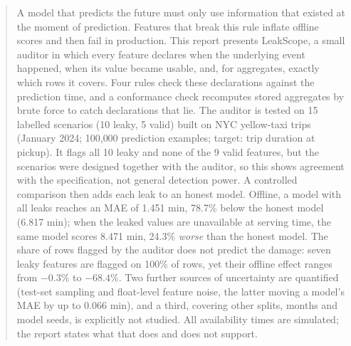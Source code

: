 \documentclass[11pt,a4paper]{article}
\newcommand{\statbox}[4]{%
  \node[draw=teal,fill=softgray,rounded corners=3pt,minimum width=3.75cm,minimum height=2.1cm,
        align=center,font=\sffamily,inner sep=4pt,text width=3.4cm]
    at ([xshift=#1,yshift=-21.2cm]current page.north west)
    {{\Large\bfseries\textcolor{navy}{#2}}\\[2pt]{\footnotesize\textcolor{gray!70!black}{#3}}};}
\begin{document}
\begin{titlepage}
\end{titlepage}

\begin{abstract}
\noindent
A model that predicts the future must only use information that existed at the moment of prediction. Features that break this rule inflate offline scores and then fail in production. This report presents LeakScope, a small auditor in which every feature declares when the underlying event happened, when its value became usable, and, for aggregates, exactly which rows it covers. Four rules check these declarations against the prediction time, and a conformance check recomputes stored aggregates by brute force to catch declarations that lie. The auditor is tested on 15 labelled scenarios (10 leaky, 5 valid) built on NYC yellow-taxi trips (January 2024; 100{,}000 prediction examples; target: trip duration at pickup). It flags all 10 leaky and none of the 9 valid features, but the scenarios were designed together with the auditor, so this shows agreement with the specification, not general detection power. A controlled comparison then adds each leak to an honest model. Offline, a model with all leaks reaches an MAE of 1.451 min, 78.7\% below the honest model (6.817 min); when the leaked values are unavailable at serving time, the same model scores 8.471 min, 24.3\% \emph{worse} than the honest model. The share of rows flagged by the auditor does not predict the damage: seven leaky features are flagged on 100\% of rows, yet their offline effect ranges from $-0.3\%$ to $-68.4\%$. Two further sources of uncertainty are quantified (test-set sampling and float-level feature noise, the latter moving a model's MAE by up to 0.066 min), and a third, covering other splits, months and model seeds, is explicitly not studied. All availability times are simulated; the report states what that does and does not support.
\end{abstract}
\end{document}
